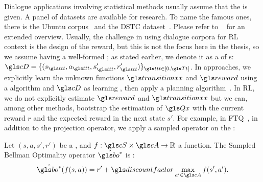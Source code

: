 Dialogue applications involving statistical methods usually assume that the  is given. A panel of  datasets are available for research. To name the famous ones, there is the Ubuntu  corpus~\parencite{Lowe2015-ubuntu-corpus} and the \gls{DSTC} dataset~\parencite{dstc}. Please refer to ~\textcite{serban2015-survey-dialogue-corpora} for an extended overview. Usually, the challenge in using dialogue corpora for \gls{RL} context is the design of the reward, but this is not the focus here in the thesis, so we assume having a well-formed ; as stated earlier, we denote it as a  of s: $\cD = \{(s_{\indextransition},a_{\indextransition},s_{\indextransition}',r_{\indextransition}')\}_{{\indextransition}\in [0,\T]}$. In  approaches, we explicitly learn the unknown functions $\transition$ and $\reward$ using a  algorithm and $\cD$ as learning , then apply a planning algorithm~\parencite{Lison2013ModelbasedBR, peng2018deep}. In   \gls{RL}, we do not explicitly estimate $\reward$ and $\transition$ but we can, among other methods, bootstrap the estimation of $\Q$ with the current reward $r$ and the expected reward in the next state $s'$. For example, in \gls{FTQ}~\parencite{Ernst05,Riedmiller05}, in addition to the projection operator, we apply a sampled  operator on the :

\begin{definition}
    Let $(s,a,s',r')$ be a , and $f:\cS\times\cA\rightarrow\mathbb{R}$ a function. The Sampled Bellman Optimality operator $\hat{\bo^{*}}$ is :
    \begin{align}
        \hat{\bo^{*}}(f(s,a)) = r' + \discountfactor  \max_{a'\in\cA} f(s',a').
    \end{align}
\end{definition}

